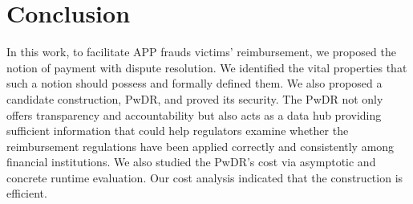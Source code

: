 
\section{Conclusion}\label{sec::conclusion}



In this work, to facilitate APP frauds victims’ reimbursement,  we proposed the notion of payment with dispute resolution. We identified the vital properties that such a notion should possess and formally defined them. We also proposed a candidate construction,  PwDR, and proved its security.  The PwDR not only offers transparency and accountability but also acts as a data hub providing sufficient information that could help regulators examine whether the reimbursement regulations have been applied correctly and consistently among financial institutions.  We also studied the PwDR's cost via asymptotic and concrete runtime evaluation. Our cost analysis indicated that the construction is efficient. 






